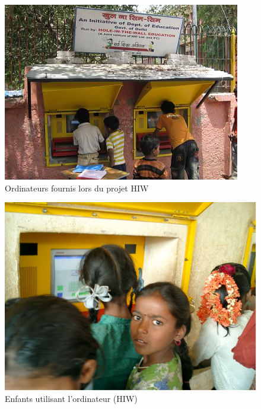 \begin{figure}[H]
  \centering
  \includegraphics[width=\textwidth]{../resources/illustrations/hiw_1}
  \caption{Ordinateurs fournis lors du projet \gls{HIW}}
\end{figure}
\begin{minipage}[H]{.45\linewidth}
  \begin{figure}[H]
    \centering
    \includegraphics[width=\textwidth]{../resources/illustrations/hiw_2}
    \caption{Enfants utilisant l'ordinateur (\gls{HIW})}
  \end{figure}
\end{minipage}
